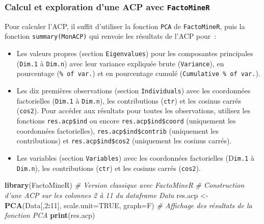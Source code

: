 \documentclass[
  11pt,
  french,
]{book}
\makeatletter
\newenvironment{Shaded}{\begin{snugshade}}{\end{snugshade}}
\newcommand{\CommentTok}[1]{\textcolor[rgb]{0.56,0.35,0.01}{\textit{#1}}}
\newcommand{\DataTypeTok}[1]{\textcolor[rgb]{0.13,0.29,0.53}{#1}}
\newcommand{\DecValTok}[1]{\textcolor[rgb]{0.00,0.00,0.81}{#1}}
\newcommand{\KeywordTok}[1]{\textcolor[rgb]{0.13,0.29,0.53}{\textbf{#1}}}
\newcommand{\NormalTok}[1]{#1}
\newcommand{\OperatorTok}[1]{\textcolor[rgb]{0.81,0.36,0.00}{\textbf{#1}}}
\newcommand{\OtherTok}[1]{\textcolor[rgb]{0.56,0.35,0.01}{#1}}
\newcommand{\StringTok}[1]{\textcolor[rgb]{0.31,0.60,0.02}{#1}}
\providecommand{\tightlist}{%
  \setlength{\itemsep}{0pt}\setlength{\parskip}{0pt}}
\newenvironment{kframe}{%
\medskip{}
\setlength{\fboxsep}{.8em}
 \def\at@end@of@kframe{}%
 \ifinner\ifhmode%
  \def\at@end@of@kframe{\end{minipage}}%
  \begin{minipage}{\columnwidth}%
 \fi\fi%
 \def\FrameCommand##1{\hskip\@totalleftmargin \hskip-\fboxsep
 \colorbox{shadecolor}{##1}\hskip-\fboxsep
     \hskip-\linewidth \hskip-\@totalleftmargin \hskip\columnwidth}%
 \MakeFramed {\advance\hsize-\width
   \@totalleftmargin\z@ \linewidth\hsize
   \@setminipage}}%
 {\par\unskip\endMakeFramed%
 \at@end@of@kframe}
\renewenvironment{Shaded}{\begin{kframe}}{\end{kframe}}
\makeatother
\begin{document}
\hypertarget{sect12231}{%
\subsubsection{\texorpdfstring{Calcul et exploration d'une ACP avec \texttt{FactoMineR}}{Calcul et exploration d'une ACP avec FactoMineR}}\label{sect12231}}

Pour calculer l'ACP, il suffit d'utiliser la fonction \texttt{PCA} de \texttt{FactoMineR}, puis la fonction \texttt{summary(MonACP)} qui renvoie les résultats de l'ACP pour~:

\begin{itemize}
\tightlist
\item
  Les valeurs propres (section \texttt{Eigenvalues}) pour les composantes principales (\texttt{Dim.1} à \texttt{Dim.n}) avec leur variance expliquée brute (\texttt{Variance}), en pourcentage (\texttt{\%\ of\ var.}) et en pourcentage cumulé (\texttt{Cumulative\ \%\ of\ var.}).
\item
  Les dix premières observations (section \texttt{Individuals}) avec les coordonnées factorielles (\texttt{Dim.1} à \texttt{Dim.n}), les contributions (\texttt{ctr}) et les cosinus carrés (\texttt{cos2}). Pour accéder aux résultats pour toutes les observations, utilisez les fonctions \texttt{res.acp\$ind} ou encore \texttt{res.acp\$ind\$coord} (uniquement les coordonnées factorielles), \texttt{res.acp\$ind\$contrib} (uniquement les contributions) et \texttt{res.acp\$ind\$cos2} (uniquement les cosinus carrés).
\item
  Les variables (section \texttt{Variables}) avec les coordonnées factorielles (D\texttt{im.1} à \texttt{Dim.n}), les contributions (\texttt{ctr}) et les cosinus carrés (\texttt{cos2}).
\end{itemize}

\begin{Shaded}
\begin{Highlighting}[]
\KeywordTok{library}\NormalTok{(FactoMineR)}
\CommentTok{# Version classique avec FactoMineR}
\CommentTok{# Construction d'une ACP sur les colonnes 2 à 11 du dataframe Data}
\NormalTok{res.acp <-}\StringTok{ }\KeywordTok{PCA}\NormalTok{(Data[,}\DecValTok{2}\OperatorTok{:}\DecValTok{11}\NormalTok{], }\DataTypeTok{scale.unit=}\OtherTok{TRUE}\NormalTok{, }\DataTypeTok{graph=}\NormalTok{F)}
\CommentTok{# Affichage des résultats de la fonction PCA}
\KeywordTok{print}\NormalTok{(res.acp)}
\end{Highlighting}
\end{Shaded}
\end{document}
